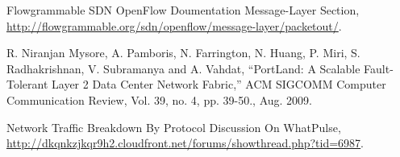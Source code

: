 \begin{thebibliography}{1}
Flowgrammable SDN OpenFlow Doumentation Message-Layer Section, \url{http://flowgrammable.org/sdn/openflow/message-layer/packetout/}.

R. Niranjan Mysore, A. Pamboris, N. Farrington, N. Huang, P. Miri, S. Radhakrishnan, V. Subramanya and A. Vahdat, ``PortLand: A Scalable Fault-Tolerant Layer 2 Data Center Network Fabric,'' ACM SIGCOMM Computer Communication Review, Vol. 39, no. 4, pp. 39-50., Aug. 2009.

Network Traffic Breakdown By Protocol Discussion On WhatPulse, \url{http://dkqnkzjkqr9h2.cloudfront.net/forums/showthread.php?tid=6987}.
\end{thebibliography}
